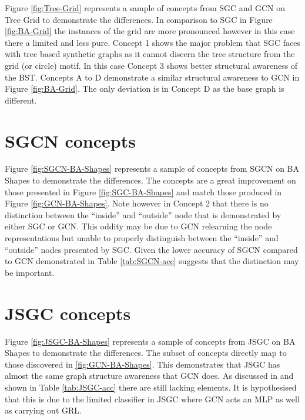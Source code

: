 Figure \ref{fig:Tree-Grid} represents a sample of concepts from SGC and GCN on Tree Grid to demonstrate the differences.
In comparison to SGC in Figure \ref{fig:BA-Grid} the instances of the grid are more pronounced however in this case there a limited and less pure.
Concept 1 shows the major problem that SGC faces with tree based synthetic graphs as it cannot discern the tree structure from the grid (or circle) motif.
In this case Concept 3 shows better structural awareness of the BST.
Concepts A to D demonstrate a similar structural awareness to GCN in Figure \ref{fig:BA-Grid}.
The only deviation is in Concept D as the base graph is different.

\section{SGCN concepts}


Figure \ref{fig:SGCN-BA-Shapes} represents a sample of concepts from SGCN on BA Shapes to demonstrate the differences.
The concepts are a great improvement on those presented in Figure \ref{fig:SGC-BA-Shapes} and match those produced in Figure \ref{fig:GCN-BA-Shapes}.
Note however in Concept 2 that there is no distinction between the ``inside'' and ``outside'' node that is demonstrated by either SGC or GCN.
This oddity may be due to GCN relearning the node representations but unable to properly distinguish between the ``inside'' and ``outside'' nodes presented by SGC.
Given the lower accuracy of SGCN compared to GCN demonstrated in Table \ref{tab:SGCN-acc} suggests that the distinction may be important.

\section{JSGC concepts}


Figure \ref{fig:JSGC-BA-Shapes} represents a sample of concepts from JSGC on BA Shapes to demonstrate the differences.
The subset of concepts directly map to those discovered in \ref{fig:GCN-BA-Shapes}.
This demonstrates that JSGC has almost the same graph structure awareness that GCN does.
As discussed in  and shown in Table \ref{tab:JSGC-acc} there are still lacking elements.
It is hypothesised that this is due to the limited classifier in JSGC where GCN acts an MLP as well as carrying out GRL.
